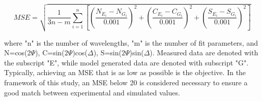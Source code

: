 \begin{equation}
MSE = \sqrt{ \frac{1}{3n - m} \sum_{i=1}^{n} \left[ 
\left( \frac{N_{E_i} - N_{G_i}}{0.001} \right)^2 + 
\left( \frac{C_{E_i} - C_{G_i}}{0.001} \right)^2 + 
\left( \frac{S_{E_i} - S_{G_i}}{0.001} \right)^2 
\right] }
\label{eq:mse}
\end{equation}

where  "n" is the number of wavelengths, "m" is the number of fit parameters, and N=cos(2$\Psi$), C=sin($2\Psi$)cos($\Delta$), S=sin($2\Psi$)sin($\Delta$). Measured data are denoted with the subscript "E", while model generated data are denoted with subscript "G". Typically, achieving an MSE that is as low as possible is the objective. In the framework of this study, an MSE below 20 is considered necessary to ensure a good match between experimental and simulated values. 


